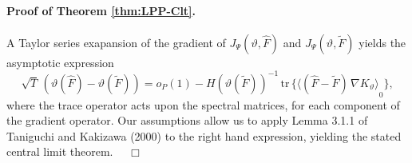 \documentclass[a4paper]{book}
\begin{document}
\paragraph{Proof of Theorem \ref{thm:LPP-Clt}.}
 A Taylor series exapansion of the gradient of $J_{\Psi} (\vartheta, \widehat{F})$ and $J_{\Psi} (\vartheta, \widetilde{F})$ yields the 
 asymptotic expression
\[
  \sqrt{T} \, \left( \vartheta( \widehat{F} ) - \vartheta (\widetilde{F}) \right)  = o_P (1) 
   - { H (\vartheta( \widetilde{F} )) }^{-1} \,  \mbox{tr} \, \{  {  \langle (\widehat{F} - \widetilde{F}) \, \nabla K_{\vartheta} \rangle }_0 \},
\]
 where the trace operator acts upon the spectral matrices, for each component of the gradient operator.  Our assumptions allow
 us to apply Lemma 3.1.1 of Taniguchi and Kakizawa (2000) to the right hand expression, yielding the stated central limit theorem.
 $\quad \Box$

\vspace{.5cm}
\end{document}
